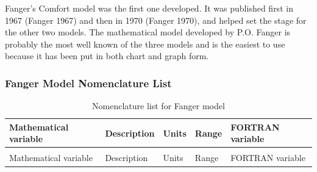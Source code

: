 Fanger's Comfort model was the first one developed. It was published first in 1967 (Fanger 1967) and then in 1970 (Fanger 1970), and helped set the stage for the other two models. The mathematical model developed by P.O. Fanger is probably the most well known of the three models and is the easiest to use because it has been put in both chart and graph form.

\subsubsection{Fanger Model Nomenclature List}\label{fanger-model-nomenclature-list}

\begin{longtable}[c]{p{1.2in}p{2.0in}p{0.8in}p{0.8in}p{1.2in}}
\caption{Nomenclature list for Fanger model \label{table:nomenclature-list-for-fanger-model}} \tabularnewline
\toprule 
Mathematical variable & Description & Units & Range & FORTRAN variable \tabularnewline
\midrule
\endfirsthead

\caption[]{Nomenclature list for Fanger model} \tabularnewline
\toprule 
Mathematical variable & Description & Units & Range & FORTRAN variable \tabularnewline
\midrule
\endhead


\end{longtable}
